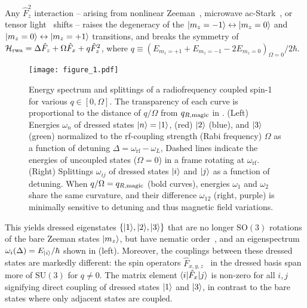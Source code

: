 \documentclass[aps,prl,reprint,superscriptaddress,floatfix]{revtex4-1}
\begin{document}
Any $\hat{F}_z^2$ interaction -- arising from nonlinear Zeeman~\cite{ramsey_molecular_1956}, microwave ac-Stark~\cite{gerbier_resonant_2006}, or tensor light~\cite{smith_continuous_2004} shifts -- raises the degeneracy of the $\vert m_z=-1 \rangle  \leftrightarrow \vert m_z=0 \rangle $ and $\vert m_z=0 \rangle  \leftrightarrow \vert m_z=+1 \rangle $ transitions, and breaks the symmetry of $\mathcal{H}_{\text{rwa}} = \Delta \hat{F}_z + \Omega \hat{F}_x + q \hat{F}_z^2$, where $q \equiv (E_{m_z=+1} + E_{m_z=-1} - 2 E_{m_z=0})_{\Omega=0}/2\hbar$.
\begin{figure}
    \texttt{[image: figure\_1.pdf]}
    \caption{
    \label{fig:eigensystem_schematic}
        Energy spectrum and splittings of a radiofrequency coupled spin-1 for various $q \in [0,\Omega]$.
        The transparency of each curve is proportional to the distance of $q/\Omega$ from $q_{R,\text{magic}}$ in .
        (Left) Energies $\omega_n$ of dressed states $\vert n \rangle =\vert 1 \rangle $, (red) $\vert 2 \rangle $ (blue), and $\vert 3 \rangle $ (green) normalized to the rf-coupling strength (Rabi frequency) $\Omega$ as a function of detuning $\Delta=\omega_{\text{rf}}-\omega_L$,
        Dashed lines indicate the energies of uncoupled states ($\Omega=0$) in a frame rotating at $\omega_{\text{rf}}$.
        (Right) Splittings $\omega_{ij}$ of dressed states $\vert i \rangle $ and $\vert j \rangle $ as a function of detuning.
        When $q/\Omega=q_{R,\text{magic}}$ (bold curves), energies $\omega_1$ and $\omega_2$ share the same curvature, and their difference $\omega_{12}$ (right, purple) is minimally sensitive to detuning and thus magnetic field variations.
    }
\end{figure}
This yields dressed eigenstates $\{\vert 1 \rangle , \vert 2 \rangle , \vert 3 \rangle \}$ that are no longer $\text{SO}(3)$ rotations of the bare Zeeman states $\vert m_z \rangle $, but have nematic order~, and an eigenspectrum $\omega_i(\Delta) = E_{\vert i \rangle }/\hbar$ shown in  (left).%
Moreover, the couplings between these dressed states are markedly different: the spin operators $\hat{F}_{x,y,z}$~ in the dressed basis span more of $\text{SU}(3)$ for $q \neq 0$.
The matrix element $\langle i \vert  \hat{F}_x \vert j \rangle $ is non-zero for all $i,j$ signifying direct coupling of dressed states $\vert 1 \rangle $ and $\vert 3 \rangle $, in contrast to the bare states where only adjacent states are coupled. 
\end{document}
